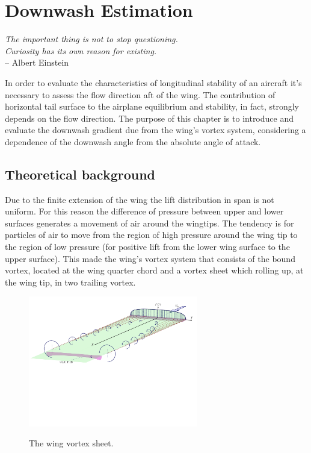 \chapter{Downwash Estimation}
\label{ch:workobject}

\begin{flushright}
	{\smaller
		\textit{The important thing is not to stop questioning.\\  Curiosity has its own reason for existing.}\\
		-- Albert Einstein}
\end{flushright}

In order to evaluate the characteristics of longitudinal stability of an aircraft it's necessary to assess the flow direction aft of the wing. The contribution of horizontal tail surface to the airplane equilibrium and stability, in fact, strongly depends on the flow direction. The purpose of this chapter is to introduce and evaluate the downwash gradient due from the wing's vortex system, considering a dependence of the downwash angle from the absolute angle of attack. 

\section{Theoretical background}

Due to the finite extension of the wing the lift distribution in span is not uniform. For this reason the difference of pressure between upper and lower surfaces generates a movement of air around the wingtips. The tendency is for particles of air to move from the region of high pressure around the wing tip to the region of low pressure (for positive lift from the lower wing surface to the upper surface). This made the wing's vortex system that consists of the bound vortex, located at the wing quarter chord and a vortex sheet which rolling up, at the wing tip, in two trailing vortex.\cite{PerkinsHage} \cite{Jacobs:NACA:Rep:648} \\ 


\begin{figure}[H]
\centering
{\includegraphics[height=5.7cm]{Immagini/wing_vortex_sheet3.pdf}} 
\caption{The wing vortex sheet.}
\end{figure}

